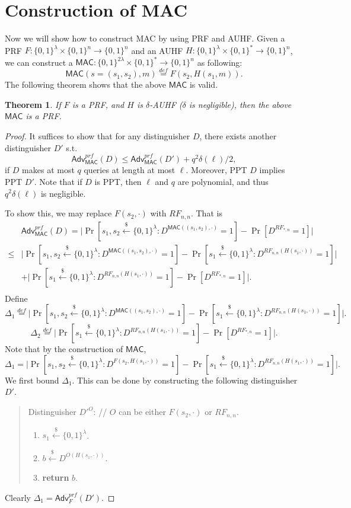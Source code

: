 \documentclass[12pt]{article}
\newcommand{\eqdef}{\stackrel{def}{=}}
\newcommand{\bits}{\{0,1\}}
\newcommand{\getsr}{\stackrel{\$}{\gets}}
\newcommand{\Adv}{\mathsf{Adv}}
\newcommand{\MAC}{\mathsf{MAC}}
\newtheorem{theorem}{Theorem}[section]
\theoremstyle{definition}
\begin{document}
\section{Construction of MAC}
Now we will show how to construct MAC by using PRF and AUHF. Given a PRF $F : \bits^\lambda \times \bits^n \to \bits^n$ and an AUHF $H : \bits^\lambda \times \bits^* \to \bits^n$, we can construct a $\MAC : \bits^{2\lambda} \times \bits^* \to \bits^n$ as following:
$$\MAC (s = (s_1,s_2), m) \eqdef F(s_2, H(s_1, m)).$$
The following theorem shows that the above $\MAC$ is valid.

\begin{theorem}
If $F$ is a PRF, and $H$ is $\delta$-AUHF ($\delta$ is negligible), then the above $\MAC$ is a PRF.
\end{theorem}
\begin{proof}
It suffices to show that for any distinguisher $D$, there exists another distinguisher $D'$ s.t. 
$$\Adv_{\MAC}^{prf}(D) \leq \Adv_{\MAC}^{prf}(D') + q^2 \delta(\ell)/2,$$
if $D$ makes at most $q$ queries at length at most $\ell$. 
Moreover, PPT $D$ implies PPT $D'$.
Note that if $D$ is PPT, then $\ell$ and $q$ are polynomial, and thus $q^2 \delta(\ell)$ is negligible.

To show this, we may replace $F(s_2,\cdot)$ with $RF_{n,n}$. That is
$$\begin{aligned}
&\Adv_{\MAC}^{prf}(D) = \bigg| \Pr[s_1,s_2 \getsr \bits^\lambda : D^{\MAC((s_1,s_2),\cdot)}=1] - \Pr[D^{RF_{*,n}}=1] \bigg| \\
\leq & \bigg| \Pr[s_1,s_2 \getsr \bits^\lambda : D^{\MAC((s_1,s_2),\cdot)}=1] - \Pr[s_1 \getsr \bits^\lambda : D^{RF_{n,n}(H(s_1,\cdot))}=1] \bigg| \\
&+ \bigg| \Pr[s_1 \getsr \bits^\lambda : D^{RF_{n,n}(H(s_1,\cdot))}=1] - \Pr[D^{RF_{*,n}}=1] \bigg|. \\
\end{aligned}$$
Define
$$\Delta_1 \eqdef \bigg| \Pr[s_1,s_2 \getsr \bits^\lambda : D^{\MAC((s_1,s_2),\cdot)}=1] - \Pr[s_1 \getsr \bits^\lambda : D^{RF_{n,n}(H(s_1,\cdot))}=1] \bigg|.$$
$$\Delta_2 \eqdef \bigg| \Pr[s_1 \getsr \bits^\lambda : D^{RF_{n,n}(H(s_1,\cdot))}=1] - \Pr[D^{RF_{*,n}}=1] \bigg|.$$
Note that by the construction of $\MAC$,
$$\Delta_1 = \bigg| \Pr[s_1,s_2 \getsr \bits^\lambda : D^{F(s_2,H(s_1,\cdot))}=1] - \Pr[s_1 \getsr \bits^\lambda : D^{RF_{n,n}(H(s_1,\cdot))}=1] \bigg|.$$
We first bound $\Delta_1$. This can be done by constructing the following distinguisher $D'$.
\begin{quote}
Distinguisher $D'^O$: // $O$ can be either $F(s_2, \cdot)$ or $RF_{n,n}$.
\begin{enumerate}
\item $s_1 \getsr \bits^\lambda$.
\item $b \getsr D^{O(H(s_1,\cdot))}$.
\item {\bf return} $b$.
\end{enumerate}
\end{quote}
Clearly $\Delta_1 = \Adv_{F}^{prf}(D')$.


\end{proof}
\end{document}

